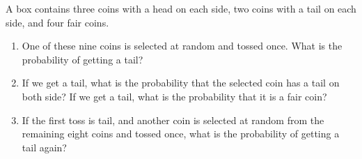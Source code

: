 
\begin{exercise}

A box contains three coins with a head on each side, two coins with a tail on each side, and four fair coins.

\begin{enumerate}[label = (\alph*)]

    \item One of these nine coins is selected at random and tossed once.
    What is the probability of getting a tail?

    \item If we get a tail, what is the probability that the selected coin has a tail on both side?
    If we get a tail, what is the probability that it is a fair coin?

    \item If the first toss is tail, and another coin is selected at random from the remaining eight coins and tossed once, what is the probability of getting a tail again?

\end{enumerate}

\end{exercise}



